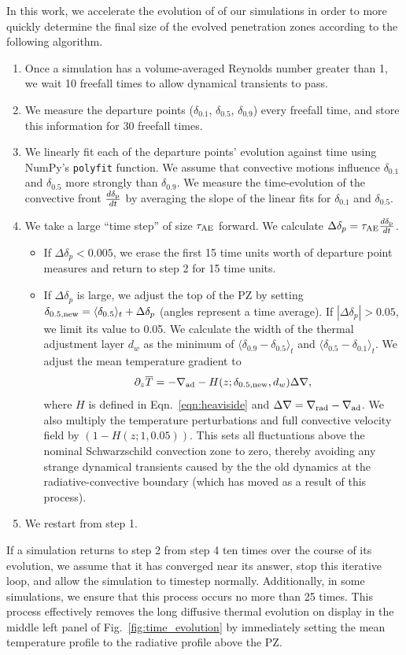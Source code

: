 \documentclass{aastex631}
\newcommand{\gradrad}{\ensuremath{\nabla_{\rm{rad}}}}
\newcommand{\gradad}{\ensuremath{\nabla_{\rm{ad}}}}
\newcommand{\justgrad}{\ensuremath{\nabla}}
\newcommand{\delp}{\ensuremath{\delta_{\rm{p}}}}
\newcommand{\angles}[1]{\langle #1 \rangle}
\begin{document}
In this work, we accelerate the evolution of of our simulations in order to more quickly determine the final size of the evolved penetration zones according to the following algorithm.
\begin{enumerate}
\item Once a simulation has a volume-averaged Reynolds number greater than 1, we wait 10 freefall times to allow dynamical transients to pass.
\item We measure the departure points ($\delta_{0.1}$, $\delta_{0.5}$, $\delta_{0.9}$) every freefall time, and store this information for 30 freefall times.
\item We linearly fit each of the departure points' evolution against time using NumPy's \texttt{polyfit} function.
We assume that convective motions influence $\delta_{0.1}$ and $\delta_{0.5}$ more strongly than $\delta_{0.9}$.
We measure the time-evolution of the convective front $\frac{d \delp}{dt}$ by averaging the slope of the linear fits for $\delta_{0.1}$ and $\delta_{0.5}$.
\item We take a large ``time step'' of size $\tau_{\rm{AE}}$ forward.
We calculate $\Delta \delta_p = \tau_{\rm{AE}} \frac{d \delp}{dt}$.
\begin{itemize}
\item If $\Delta \delta_p < 0.005$, we erase the first 15 time units worth of departure point measures and return to step 2 for 15 time units.
\item  If $\Delta \delta_p$ is large, we adjust the top of the PZ by setting $\delta_{0.5,\rm{new}} = \angles{\delta_{0.5}}_t + \Delta \delta_p$ (angles represent a time average).
If $|\Delta \delta_p| > 0.05$, we limit its value to 0.05.
We calculate the width of the thermal adjustment layer $d_w$ as the minimum of $\angles{\delta_{0.9} - \delta_{0.5}}_t$ and $\angles{\delta_{0.5} - \delta_{0.1}}_t$.
We adjust the mean temperature gradient to
\begin{equation}
\partial_z \overline{T} = -\gradad - H(z; \delta_{\rm{0.5,\rm{new}}}, d_w) \Delta\justgrad,
\label{eqn:initial_grad}
\end{equation}
where $H$ is defined in Eqn.~\ref{eqn:heaviside} and $\Delta\justgrad = \gradrad - \gradad$.
We also multiply the temperature perturbations and full convective velocity field by $(1 - H(z; 1, 0.05))$.
This sets all fluctuations above the nominal Schwarzschild convection zone to zero, thereby avoiding any strange dynamical transients caused by the the old dynamics at the radiative-convective boundary (which has moved as a result of this process).
\end{itemize}
\item We restart from step 1.
\end{enumerate}
If a simulation returns to step 2 from step 4 ten times over the course of its evolution, we assume that it has converged near its answer, stop this iterative loop, and allow the simulation to timestep normally.
Additionally, in some simulations, we ensure that this process occurs no more than 25 times.
This process effectively removes the long diffusive thermal evolution on display in the middle left panel of Fig.~\ref{fig:time_evolution} by immediately setting the mean temperature profile to the radiative profile above the PZ.
\end{document}
